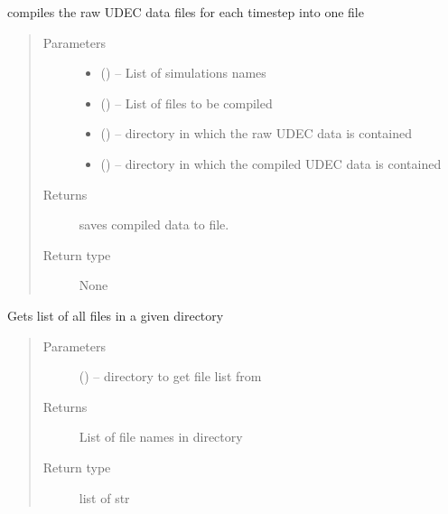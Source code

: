 \documentclass[letterpaper,10pt,english]{sphinxmanual}
\begin{document}
\begin{fulllineitems}
\label{\detokenize{MouseReferenceManual:Modules.Module_UDEC.compileFiles}}
compiles the raw UDEC data files for each timestep into one file
\begin{quote}\begin{description}
\item[{Parameters}] \leavevmode\begin{itemize}
\item {} 
 () -- List of simulations names

\item {} 
 () -- List of files to be compiled

\item {} 
 () -- directory in which the raw UDEC data is contained

\item {} 
 () -- directory in which the compiled UDEC data is contained

\end{itemize}

\item[{Returns}] \leavevmode
saves compiled data to file.

\item[{Return type}] \leavevmode
None

\end{description}\end{quote}

\end{fulllineitems}


\begin{fulllineitems}
\label{\detokenize{MouseReferenceManual:Modules.Module_UDEC.fileList}}
Gets list of all files in a given directory
\begin{quote}\begin{description}
\item[{Parameters}] \leavevmode
{} () -- directory to get file list from

\item[{Returns}] \leavevmode
List of file names in directory

\item[{Return type}] \leavevmode
list of str

\end{description}\end{quote}

\end{fulllineitems}
\end{document}
